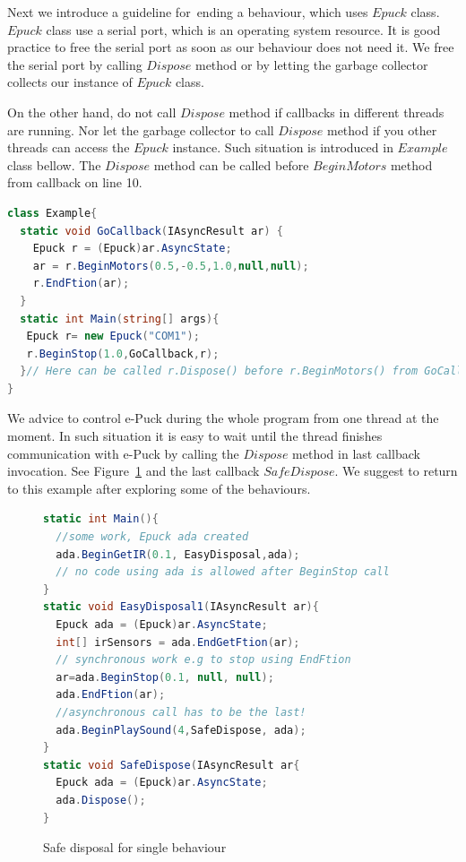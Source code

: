   Next we introduce a guideline for~ending a behaviour, which uses $Epuck$ class.
  $Epuck$ class use a serial port, which is an operating system resource. 
  It is good practice to free the serial port as soon as our behaviour does not need it.
  We free the serial port by calling $Dispose$ method or 
  by letting the garbage collector collects our instance of $Epuck$ class.

  On the other hand, do not call $Dispose$ method if callbacks in different threads are running.
  Nor let the garbage collector to call $Dispose$ method if you other threads can access the $Epuck$ instance.
  Such situation is introduced in $Example$ class bellow. The $Dispose$ method
  can be called before $BeginMotors$ method from callback on line 10.
\begin{lstlisting}[language=cs]
class Example{
  static void GoCallback(IAsyncResult ar) {
    Epuck r = (Epuck)ar.AsyncState;
    ar = r.BeginMotors(0.5,-0.5,1.0,null,null);
    r.EndFtion(ar);
  }
  static int Main(string[] args){
   Epuck r= new Epuck("COM1");
   r.BeginStop(1.0,GoCallback,r);
  }// Here can be called r.Dispose() before r.BeginMotors() from GoCallback()
}
\end{lstlisting}
  
  We advice to control e-Puck during the whole program from one thread at the moment.
  In such situation it is easy to wait until the thread finishes communication with e-Puck
  by calling the $Dispose$ method in last callback invocation. See Figure~\ref{safedis} and the last callback $SafeDispose$.
  We suggest to return to this example after exploring some of the behaviours.

\begin{figure}[!hbp]	
\begin{lstlisting}[language=cs]
static int Main(){
  //some work, Epuck ada created
  ada.BeginGetIR(0.1, EasyDisposal,ada);
  // no code using ada is allowed after BeginStop call
}
static void EasyDisposal1(IAsyncResult ar){
  Epuck ada = (Epuck)ar.AsyncState;
  int[] irSensors = ada.EndGetFtion(ar);
  // synchronous work e.g to stop using EndFtion
  ar=ada.BeginStop(0.1, null, null);
  ada.EndFtion(ar);
  //asynchronous call has to be the last!
  ada.BeginPlaySound(4,SafeDispose, ada);
}
static void SafeDispose(IAsyncResult ar{
  Epuck ada = (Epuck)ar.AsyncState;
  ada.Dispose();
}
\end{lstlisting}
\caption{Safe disposal for single behaviour} \label{safedis}
\end{figure}

